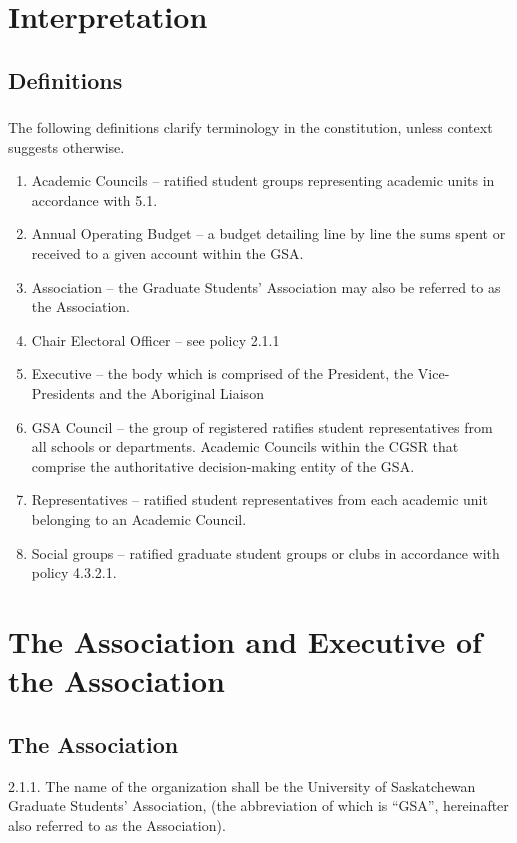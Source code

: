 \section{Interpretation}
\subsection{Definitions} 
\subsubsection {}The following definitions clarify terminology in the constitution, unless context suggests otherwise. 
\begin{enumerate}[i]
\item Academic Councils – ratified student groups representing academic units in accordance with 5.1. 
\item Annual Operating Budget – a budget detailing line by line the sums spent or received to a given account within the GSA. 
\item Association – the Graduate Students’ Association may also be referred to as the Association. 
\item Chair Electoral Officer – see policy 2.1.1 
\item Executive – the body which is comprised of the President, the Vice-Presidents and the Aboriginal Liaison 
\item GSA Council – the group of registered ratifies student representatives from all schools or departments. Academic Councils within the CGSR that comprise the authoritative decision-making entity of the GSA. 
\item  Representatives – ratified student representatives from each academic unit belonging to an Academic Council. 
\item  Social groups – ratified graduate student groups or clubs in accordance with policy 4.3.2.1. 
\end{enumerate}

\section{The Association and Executive of the Association }
\subsection{ The Association }
2.1.1. The name of the organization shall be the University of Saskatchewan Graduate Students’ Association, (the abbreviation of which is “GSA”, hereinafter also referred to as the Association). 

